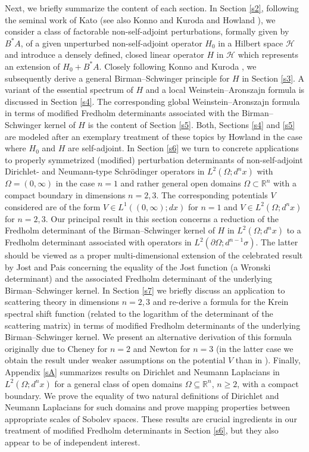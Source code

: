 \documentclass[reqno,10pt, centertags]{amsart}
\newcommand{\bbR}{{\mathbb{R}}}
\newcommand{\cH}{{\mathcal H}}
\newcommand{\Om}{\Omega}
\numberwithin{equation}{section}
\theoremstyle{definition}
\begin{document}
Next, we briefly summarize the content of each section. In Section
\ref{s2}, following the seminal work of Kato \cite{Ka66} (see also Konno
and Kuroda \cite{KK66} and Howland \cite{Ho70}), we consider a  class of
factorable non-self-adjoint perturbations, formally given by
$B^* A$, of a given unperturbed non-self-adjoint operator $H_0$ in a
Hilbert space $\cH$ and introduce a densely defined, closed linear
operator $H$ in $\cH$ which represents an extension of $H_0+B^*A$. Closely
following Konno and Kuroda \cite{KK66}, we subsequently derive a general
Birman--Schwinger principle for $H$ in Section \ref{s3}. A variant of the
essential spectrum of $H$ and a local Weinstein--Aronszajn formula is
discussed in Section \ref{s4}. The corresponding global
Weinstein--Aronszajn formula in terms of modified Fredholm determinants
associated with the Birman--Schwinger kernel of $H$ is the content of
Section \ref{s5}. Both, Sections \ref{s4} and \ref{s5} are modeled after
an exemplary treatment of these topics by Howland \cite{Ho70} in
the case where $H_0$ and $H$ are self-adjoint. In Section \ref{s6} we
turn to concrete applications to properly symmetrized (modified)
perturbation determinants of non-self-adjoint Dirichlet- and
Neumann-type Schr\"odinger operators in $L^2(\Om;d^n x)$ with
$\Om=(0,\infty)$ in the case $n=1$ and rather general open domains
$\Om\subset \bbR^n$ with a compact boundary in dimensions $n=2,3$. The
corresponding potentials $V$ considered are of the form $V\in
L^1((0,\infty);dx)$ for
$n=1$ and $V\in L^2(\Om;d^nx)$ for $n=2,3$. Our principal result in
this section concerns a reduction of the Fredholm determinant of the
Birman--Schwinger kernel of $H$ in $L^2(\Om;d^n x)$ to a Fredholm
determinant associated with operators in $L^2(\partial\Om;
d^{n-1}\sigma)$. The latter should be viewed as a proper
multi-dimensional extension of the celebrated result by Jost and Pais
\cite{JP51} concerning the equality of the Jost function (a Wronski
determinant) and the associated Fredholm determinant of the underlying
Birman--Schwinger kernel. In Section \ref{s7} we briefly discuss an
application to scattering theory in dimensions $n=2,3$ and re-derive a
formula for the Krein spectral shift function (related to the logarithm
of the determinant of the scattering matrix) in terms of modified
Fredholm determinants of the underlying Birman--Schwinger kernel. We
present an alternative derivation of this formula originally due to
Cheney \cite{Ch84} for $n=2$ and Newton \cite{Ne77} for $n=3$ (in the
latter case we obtain the result under weaker assumptions on the
potential $V$ than in \cite{Ne77}). Finally, Appendix \ref{sA}
summarizes results on Dirichlet and Neumann Laplacians in
$L^2(\Om;d^nx)$ for a general class of open domains
$\Omega\subseteq\bbR^n$, $n\geq 2$, with a compact boundary. We prove the
equality of two natural definitions of Dirichlet and Neumann Laplacians
for such domains and prove mapping properties between appropriate scales
of Sobolev spaces. These results are crucial ingredients in our treatment
of modified Fredholm determinants in Section \ref{s6}, but they also
appear to be of independent interest.
\end{document}
